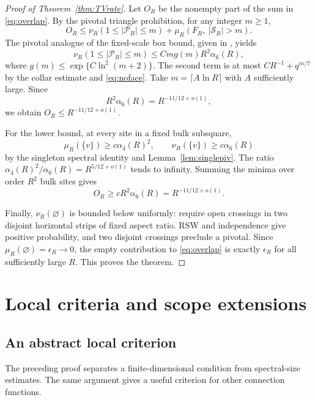 \documentclass[11pt]{amsart}
\theoremstyle{remark}
\newcommand{\cS}{\mathcal S}
\newcommand{\cP}{\mathcal P}
\begin{document}
\begin{proof}[Proof of Theorem~\ref{thm:TVrate}]
Let $O_R$ be the nonempty part of the sum in \eqref{eq:overlap}. By the pivotal triangle prohibition, for any integer $m\ge1$,
\[
 O_R\le\nu_R(1\le|\cP_R|\le m)
       +\mu_R(F_R,\ |\cS_R|>m).
\]
The pivotal analogue of the fixed-scale box bound, given in \cite[Remark~4.6]{GPS}, yields
\[
 \nu_R(1\le|\cP_R|\le m)\le C m g(m)R^2\alpha_6(R),
\]
where $g(m)\le\exp\{C\ln^2(m+2)\}$. The second term is at most $CR^{-1}+q^{m/7}$ by the collar estimate and \eqref{eq:noface}. Take $m=\lceil A\ln R\rceil$ with $A$ sufficiently large. Since
\[
 R^2\alpha_6(R)=R^{-11/12+o(1)},
\]
we obtain $O_R\le R^{-11/12+o(1)}$.

For the lower bound, at every site in a fixed bulk subsquare,
\[
 \mu_R(\{v\})\ge c\alpha_4(R)^2,\qquad
 \nu_R(\{v\})\ge c\alpha_6(R)
\]
by the singleton spectral identity and Lemma~\ref{lem:singlepiv}. The ratio $\alpha_4(R)^2/\alpha_6(R)=R^{5/12+o(1)}$ tends to infinity. Summing the minima over order $R^2$ bulk sites gives
\[
 O_R\ge cR^2\alpha_6(R)=R^{-11/12+o(1)}.
\]

Finally, $\nu_R(\varnothing)$ is bounded below uniformly: require open crossings in two disjoint horizontal strips of fixed aspect ratio. RSW and independence give positive probability, and two disjoint crossings preclude a pivotal. Since $\mu_R(\varnothing)=\epsilon_R\to0$, the empty contribution to \eqref{eq:overlap} is exactly $\epsilon_R$ for all sufficiently large $R$. This proves the theorem.
\end{proof}

\section{Local criteria and scope extensions}\label{sec:localscope}
\subsection{An abstract local criterion}\label{sec:criterion}

The preceding proof separates a finite-dimensional condition from spectral-size estimates. The same argument gives a useful criterion for other connection functions.
\end{document}
